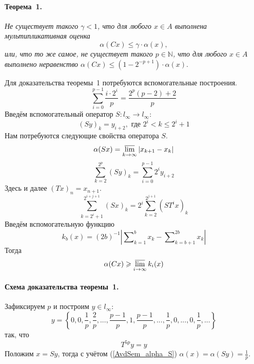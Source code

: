\paragraph{Теорема~1.}
{\it
    Не существует такого $\gamma < 1$,
    что для любого $x\in A$ выполнена мультипликативная оценка
    $$
        \alpha(Cx) \leqslant \gamma \cdot \alpha(x)
    ,
    $$
или, что то же самое, не существует такого $p\in \mathbb{N}$,
    что для любого $x\in A$ выполнено неравенство
    $
        \alpha(Cx) \leqslant (1-2^{-p+1})\cdot \alpha(x).
    $
}

Для доказательства теоремы~1 потребуются вспомогательные
построения.
\begin{equation}\label{AvdSem_summa_drobey}
    \sum_{i=0}^{p-1} \frac{i \cdot 2^i}{p} = \frac{2^p(p-2) + 2}{p}
\end{equation}
Введём вспомогательный оператор $S:l_\infty \to l_\infty$:
\begin{equation*}\label{operator_S}
    (Sy)_k = y_{i+2}, \mbox{ где } 2^i < k \leqslant 2^i+1
\end{equation*}
Нам потребуются следующие свойства оператора $S$.
\begin{equation}\label{AvdSem_alpha_S}
    \alpha(Sx) = \varlimsup_{k\to\infty} |x_{k+1} - x_{k}|
\end{equation}
\begin{equation}\label{AvdSem_summa_S_less}
    \sum_{k=2}^{2^p} (Sy)_k =
    \sum_{i=0}^{p-1} 2^i y_{i+2}
\end{equation}
Здесь и далее $(Tx)_n = x_{n+1}$.
\begin{equation}\label{AvdSem_summa_S}
    \sum_{k=2^i+1}^{2^{i+j+1}} (Sx)_k =
    2^i\sum_{k=2}^{2^{j+1}} (ST^ix)_k
\end{equation}
Введём вспомогательную функцию
\begin{equation*}\label{def_k_b}
    k_b(x) = (2b)^{-1} \left|
        \sum\nolimits_{k=1}^{b}x_k - \sum\nolimits_{k=b+1}^{2b}x_k
    \right|
\end{equation*}
Тогда
\begin{equation}\label{AvdSem_alpha_greater_k_b}
    \alpha (Cx) \geqslant \varlimsup_{i\to \infty} k_i(x)
\end{equation}

\paragraph{Схема доказательства теоремы~1.}
Зафиксируем $p$ и построим $y\in l_\infty$:
\begin{equation*}\label{y_construction}
    y = \left\{
        0, 0, \frac{1}{p}, \frac{2}{p}, %
        ...,
        \frac{p-1}{p}, 1, \frac{p-1}{p},
        ...,
        \frac{1}{p},
        0, ..., 0,
        \frac{1}{p}, ...
    \right\}
\end{equation*}
так, что
\begin{equation}\label{AvdSem_T_y}
    T^{5p}y = y
\end{equation}
Положим $x = Sy$, тогда с учётом (\ref{AvdSem_alpha_S}) $
    \alpha (x) = \alpha (Sy) = \frac{1}{p}
$.

